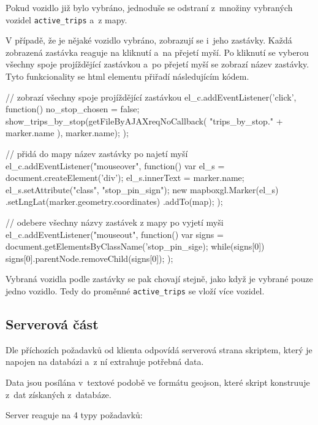 \bigbreak


Pokud vozidlo již bylo vybráno, jednoduše se odstraní z~množiny vybraných vozidel \verb-active_trips- a~z mapy.


\bigbreak


V případě, že je nějaké vozidlo vybráno, zobrazují se i~jeho zastávky. Každá zobrazená zastávka reaguje na kliknutí a~na přejetí myší. Po kliknutí se vyberou všechny spoje projíždějící zastávkou a~po přejetí myší se zobrazí název zastávky. Tyto funkcionality se \gls{html} elementu přiřadí následujícím kódem.


\begin{code}[frame=none]
// zobrazí všechny spoje projíždějící zastávkou
el_c.addEventListener('click', function() {
  no_stop_chosen = false;
  show_trips_by_stop(getFileByAJAXreqNoCallback(
    "trips_by_stop." + marker.name
  ), marker.name);
});


// přidá do mapy název zastávky po najetí myší
el_c.addEventListener("mouseover", function(){
  var el_s = document.createElement('div');
  el_s.innerText = marker.name;
  el_s.setAttribute("class", "stop_pin_sign");
  new mapboxgl.Marker(el_s)
    .setLngLat(marker.geometry.coordinates)
    .addTo(map);
});


// odebere všechny názvy zastávek z mapy po vyjetí myši
el_c.addEventListener("mouseout", function(){
  var signs = document.getElementsByClassName('stop_pin_sige);
  while(signs[0]) {
    signs[0].parentNode.removeChild(signs[0]);
  }
});
\end{code}


Vybraná vozidla podle zastávky se pak chovají stejně, jako když je vybrané pouze jedno vozidlo. Tedy do proměnné \verb-active_trips- se vloží více vozidel.


\subsection{Serverová část}

Dle příchozích požadavků od klienta odpovídá serverová strana skriptem, který je napojen na databázi a~z ní extrahuje potřebná data.


\bigbreak


Data jsou posílána v~textové podobě ve formátu \gls{geojson}, které skript konstruuje z~dat získaných z~databáze.


\bigbreak


Server reaguje na 4 typy požadavků:


